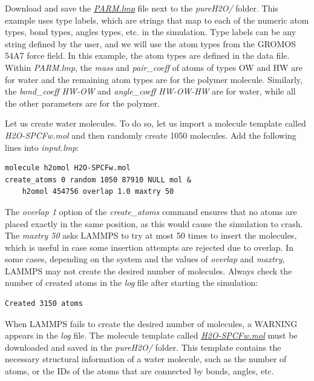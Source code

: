 \documentclass[9pt,tutorial]{livecoms}
\begin{document}
Download and save the
\href{https://raw.githubusercontent.com/lammpstutorials/lammpstutorials-article/main/files/tutorial3/PARM.lmp}{\textit{PARM.lmp}}
file next to the \textit{pureH2O/} folder. This example uses type labels, which
are strings that map to each of the numeric atom types, bond types, angles types,
etc. in the simulation. Type labels can be any string defined by the user, and we
will use the atom types from the GROMOS 54A7 force field. In this example, the atom
types are defined in the data file. Within \textit{PARM.lmp}, the \textit{mass}
and \textit{pair\_coeff} of atoms of types OW and HW are for water and the remaining
atom types are for the polymer molecule. Similarly, the \textit{bond\_coeff HW-OW}
and \textit{angle\_coeff HW-OW-HW} are for water, while all the other parameters
are for the polymer.

Let us create water molecules. To do so, let us import a molecule template called
\textit{H2O-SPCFw.mol} and then randomly create 1050 molecules. Add the following
lines into \textit{input.lmp}:
{\normalsize \begin{verbatim}
molecule h2omol H2O-SPCFw.mol
create_atoms 0 random 1050 87910 NULL mol &
    h2omol 454756 overlap 1.0 maxtry 50
\end{verbatim}}
The \textit{overlap 1} option of the \textit{create\_atoms} command ensures
that no atoms are placed exactly in the same position, as this would cause the
simulation to crash. The \textit{maxtry 50} asks LAMMPS to try at most 50 times
to insert the molecules, which is useful in case some insertion attempts are
rejected due to overlap. In some cases, depending on the system and the values
of \textit{overlap} and \textit{maxtry}, LAMMPS may not create the desired number
of molecules. Always check the number of created atoms in the \textit{log} file
after starting the simulation:
{\normalsize \begin{verbatim}
Created 3150 atoms
\end{verbatim}}
When LAMMPS fails to create the desired number of molecules, a WARNING appears
in the \textit{log} file. The molecule template called
\href{https://raw.githubusercontent.com/lammpstutorials/lammpstutorials-article/main/files/tutorial3/H2O-SPCFw.mol}{\textit{H2O-SPCFw.mol}}
must be downloaded and saved in the \textit{pureH2O/} folder. This template contains
the necessary structural information of a water molecule, such as the number of
atoms, or the IDs of the atoms that are connected by bonds, angles, etc.
\end{document}
